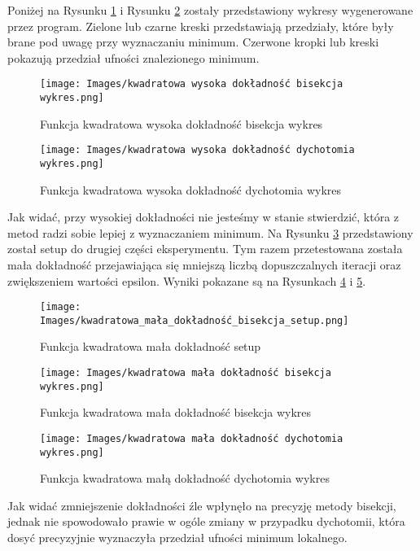 \documentclass{classrep}
\begin{document}
Poniżej na Rysunku \ref{bisekcja_wysoka_dokladnosc} i Rysunku \ref{dychotomia_wysoka_dokladnosc} zostały przedstawiony wykresy wygenerowane przez program. Zielone lub czarne kreski przedstawiają przedziały, które były brane pod uwagę przy wyznaczaniu minimum. Czerwone kropki lub kreski pokazują przedział ufności znalezionego minimum.

\begin{figure}[H]
    \centering
    \texttt{[image: Images/kwadratowa wysoka dokładność bisekcja wykres.png]}
    \caption[Funkcja kwadratowa wysoka dokładność bisekcja wykres]{Funkcja kwadratowa wysoka dokładność bisekcja wykres}
    \label{bisekcja_wysoka_dokladnosc}
\end{figure}

\begin{figure}[H]
    \centering
    \texttt{[image: Images/kwadratowa wysoka dokładność dychotomia wykres.png]}
    \caption[Funkcja kwadratowa wysoka dokładność dychotomia wykres]{Funkcja kwadratowa wysoka dokładność dychotomia wykres}
    \label{dychotomia_wysoka_dokladnosc}
\end{figure}

Jak widać, przy wysokiej dokładności nie jesteśmy w stanie stwierdzić, która z metod radzi sobie lepiej z wyznaczaniem minimum. Na Rysunku \ref{setup_mala_dokladnosc} przedstawiony został setup do drugiej części eksperymentu. Tym razem przetestowana została mała dokładność przejawiająca się mniejszą liczbą dopuszczalnych iteracji oraz zwiększeniem wartości epsilon. Wyniki pokazane są na Rysunkach \ref{bisekcja_mala_dokladnosc} i \ref{dychotomia_mala_dokladnosc}.

\begin{figure}[H]
    \centering
    \texttt{[image: Images/kwadratowa\_mała\_dokładność\_bisekcja\_setup.png]}
    \caption[Funkcja kwadratowa mała dokładność setup]{Funkcja kwadratowa mała dokładność setup}
    \label{setup_mala_dokladnosc}
\end{figure}

\begin{figure}[H]
    \centering
    \texttt{[image: Images/kwadratowa mała dokładność bisekcja wykres.png]}
    \caption[Funkcja kwadratowa mała dokładność bisekcja wykres]{Funkcja kwadratowa mała dokładność bisekcja wykres}
    \label{bisekcja_mala_dokladnosc}
\end{figure}

\begin{figure}[H]
    \centering
    \texttt{[image: Images/kwadratowa mała dokładność dychotomia wykres.png]}
    \caption[Funkcja kwadratowa mała dokładność dychotomia wykres]{Funkcja kwadratowa małą dokładność dychotomia wykres}
    \label{dychotomia_mala_dokladnosc}
\end{figure}
Jak widać zmniejszenie dokładności źle wpłynęło na precyzję metody bisekcji, jednak nie spowodowało prawie w ogóle zmiany w przypadku dychotomii, która dosyć precyzyjnie wyznaczyła przedział ufności minimum lokalnego.
\end{document}
